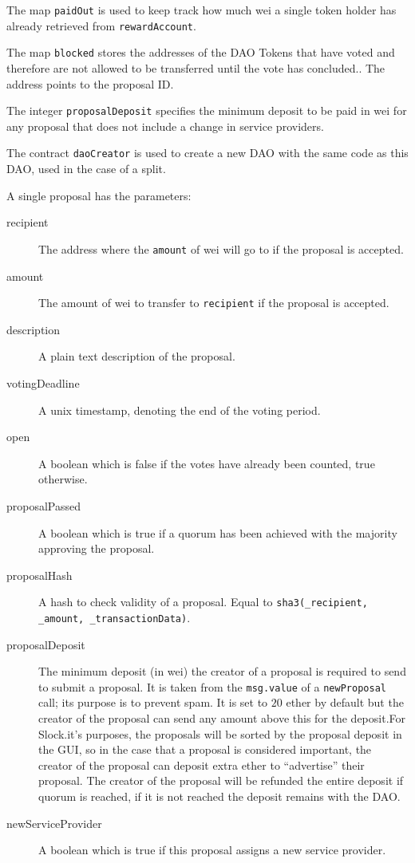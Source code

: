 \documentclass[9pt,oneside]{amsart}
\begin{document}
\begin{multicols}{2}
The map \verb|paidOut| is used to keep track how much wei a single token holder has already retrieved from \verb|rewardAccount|. 

The map \verb|blocked| stores the addresses of the DAO Tokens that have voted and therefore are not allowed to be transferred until the vote has concluded.. The address points to the proposal ID.

The integer \verb|proposalDeposit| specifies the minimum deposit to be paid in wei for any proposal that does not include a change in service providers.

The contract \verb|daoCreator| is used to create a new DAO with the same code as this DAO, used in the case of a split.

A single proposal has the parameters:
\begin{description}
 \item[recipient] The address where the \verb|amount| of wei will go to if the proposal is accepted.
 \item[amount] The amount of wei to transfer to \verb|recipient| if the proposal is accepted.
 \item[description] A plain text description of the proposal.
 \item[votingDeadline] A unix timestamp, denoting the end of the voting period.
 \item[open] A boolean which is false if the votes have already been counted, true otherwise.
 \item[proposalPassed] A boolean which is true if a quorum has been achieved with the majority approving the proposal.
 \item[proposalHash] A hash to check validity of a proposal. Equal to \verb|sha3(_recipient, _amount, _transactionData)|.
 \item[proposalDeposit] The minimum deposit (in wei) the creator of a proposal is required to send to submit a proposal. It is taken from the \verb|msg.value| of a \verb|newProposal| call; its purpose is to prevent spam. It is set to $20$ ether by default but the creator of the proposal can send any amount above this for the deposit.For Slock.it’s purposes, the proposals will be sorted by the proposal deposit in the GUI, so in the case that a proposal is considered important, the creator of the proposal can deposit extra ether to “advertise” their proposal. The creator of the proposal will be refunded the entire deposit if quorum is reached, if it is not reached the deposit remains with the DAO. 
 \item[newServiceProvider] A boolean which is true if this proposal assigns a new service provider.

\end{description}
\end{multicols}
\end{document}
